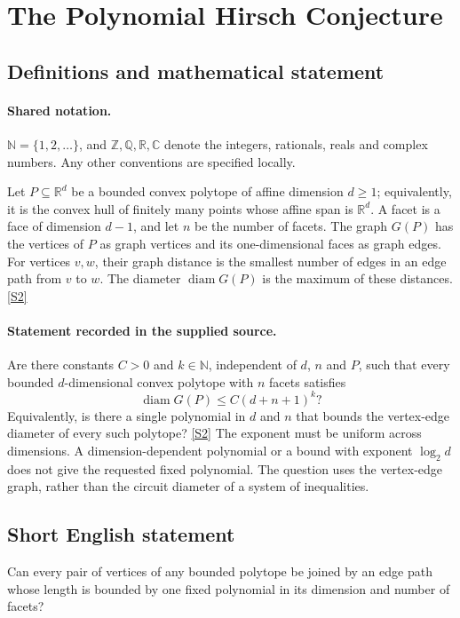 \documentclass[11pt]{article}
\newcommand{\sref}[2]{\hyperlink{source:#1:#2}{[S#2]}}
\begin{document}
\section{The Polynomial Hirsch Conjecture}\label{statement}

\subsection{Definitions and mathematical statement}

\paragraph{Shared notation.}$\mathbb N=\{1,2,\ldots\}$, and $\mathbb Z,\mathbb Q,\mathbb R,\mathbb C$ denote the integers, rationals, reals and complex numbers. Any other conventions are specified locally.


Let $P\subseteq\mathbb R^d$ be a bounded convex polytope of affine dimension $d\ge1$; equivalently, it is the convex hull of finitely many points whose affine span is $\mathbb R^d$. A facet is a face of dimension $d-1$, and let $n$ be the number of facets. The graph $G(P)$ has the vertices of $P$ as graph vertices and its one-dimensional faces as graph edges. For vertices $v,w$, their graph distance is the smallest number of edges in an edge path from $v$ to $w$. The diameter $\operatorname{diam}G(P)$ is the maximum of these distances. \sref{statement}{2}
\paragraph{Statement recorded in the supplied source.}
Are there constants $C>0$ and $k\in\mathbb N$, independent of $d$, $n$ and $P$, such that every bounded $d$-dimensional convex polytope with $n$ facets satisfies
\[
 \operatorname{diam}G(P)\le C(d+n+1)^k?
\]
Equivalently, is there a single polynomial in $d$ and $n$ that bounds the vertex-edge diameter of every such polytope? \sref{statement}{2}
The exponent must be uniform across dimensions. A dimension-dependent polynomial or a bound with exponent $\log_2 d$ does not give the requested fixed polynomial. The question uses the vertex-edge graph, rather than the circuit diameter of a system of inequalities.
\subsection{Short English statement}
Can every pair of vertices of any bounded polytope be joined by an edge path whose length is bounded by one fixed polynomial in its dimension and number of facets?
\end{document}

